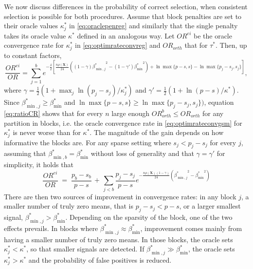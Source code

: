 \documentclass[
  12pt]{article}
\newcommand{\bX}{\mathbf{X}}
\begin{document}
We now discuss differences in the probability of correct selection, when consistent selection is possible for both procedures. Assume that block penalties are set to their oracle values $\kappa_j^*$ in \eqref{eq:oraclepenreg} and similarly that the single penalty takes its oracle value $\kappa^*$ defined in an analogous way. Let ${OR}^{ei}$ be the oracle convergence rate for $\kappa_j^*$ in \eqref{eq:optimrateconvreg} and ${OR}_{orth}$ that for $\tau^*$.
Then, up to constant factors,
\begin{equation*}
    \frac{OR^{ei}}{OR}=\sum_{j=1}^be^{-\frac{\delta}{2}\left[\frac{ n\rho(\bX)}{24}\left((1-\gamma){\beta^*_{\min,j}}^2-(1-\gamma'){\beta_{\min}^*}^2\right)+\ln \max\{p-s,s\}-\ln \max\{p_j-s_j,s_j\}\right]},
\end{equation*}
where $\gamma=\tfrac12(1+\max_j\ln(p_j-s_j)/\kappa_j^*)$ and $\gamma'=\tfrac12(1+\ln(p-s)/\kappa^*)$.
Since $\beta_{\min,j}^* \geq \beta_{\min}^*$ and $\ln \max\{p-s,s\}\geq\ln \max\{p_j-s_j,s_j\}\big)$, equation \eqref{eq:ratioCR} shows that for every $n$ large enough ${OR}^b_{orth} \leq {OR}_{orth}$ for any partition in blocks, i.e. the oracle convergence rate in \eqref{eq:optimrateconvgsm} for $\kappa_j^*$ is never worse than for $\kappa^*$. The magnitude of the gain depends on how informative the blocks are. %
For any sparse setting where $s_j<p_j-s_j$ for every $j$, assuming that $\beta_{\min,b}^*=\beta_{\min}^*$ without loss of generality and that $\gamma=\gamma'$ for simplicity, it holds that
\begin{equation}\label{eq:goodoregratio}
    \frac{OR^{ei}}{OR}\;=\; \frac{p_b-s_b}{p-s} \,+\,\sum_{j<b}\frac{p_j-s_j}{p-s}e^{-\frac{ n\rho(\bX)(1-\gamma)}{24}\left({\beta^*_{\min,j}}^2-{\beta_{\min}^*}^2\right)}
\end{equation}
There are then two sources of improvement in convergence rates: in any block $j$, a smaller number of truly zero means, that is $p_j-s_j< p-s$, or a larger smallest signal, $\beta^*_{\min,j} > \beta_{\min}^*$. Depending on the sparsity of the block, one of the two effects prevails. In blocks where $\beta^*_{\min,j} \approx \beta_{\min}^*$, improvement comes mainly from having a smaller number of truly zero means. In those blocks,
the oracle sets $\kappa^*_j < \kappa^*$, so that smaller signals are detected. If $\beta^*_{\min,j} \gg \beta_{\min}^*$, the oracle sets $\kappa^*_j > \kappa^*$ and the probability of false positives is reduced.

\end{document}
